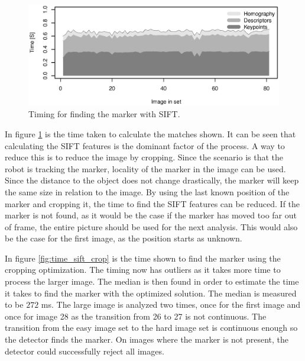 \begin{figure}[h]
 \centering
 \includegraphics[width=\fullImageWidth]{graphics/marker3_timing_unoptimized}
 \caption{Timing for finding the marker with SIFT.}
 \label{fig:time_sift_unoptimized}
\end{figure}

In figure \ref{fig:time_sift_unoptimized} is the time taken to calculate the matches shown.
It can be seen that calculating the SIFT features is the dominant factor of the process.
A way to reduce this is to reduce the image by cropping.
Since the scenario is that the robot is tracking the marker, locality of the marker in the image can be used.
Since the distance to the object does not change drastically, the marker will keep the same size in relation to the image.
By using the last known position of the marker and cropping it, the time to find the SIFT features can be reduced.
If the marker is not found, as it would be the case if the marker has moved too far out of frame, the entire picture should be used for the next analysis.
This would also be the case for the first image, as the position starts as unknown.

In figure \ref{fig:time_sift_crop} is the time shown to find the marker using the cropping optimization.
The timing now has outliers as it takes more time to process the larger image.
The median is then found in order to estimate the time it takes to find the marker with the optimized solution.
The median is measured to be $272$ ms.
The large image is analyzed two times, once for the first image and once for image 28 as the transition from 26 to 27 is not continuous.
The transition from the easy image set to the hard image set is continuous enough so the detector finds the marker.
On images where the marker is not present, the detector could successfully reject all images.


